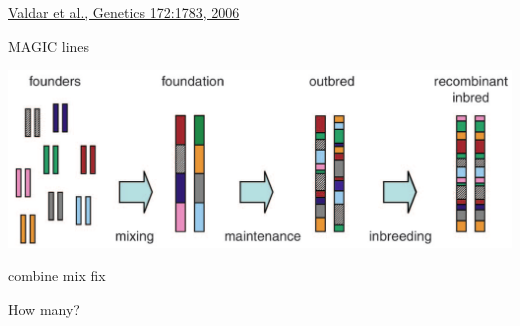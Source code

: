 \documentclass[12pt]{article}
\newcommand{\citesize}{\fontsize{14}{18} \selectfont}
\newcommand{\headsize}{\fontsize{35}{35} \selectfont}
\newcommand{\smallsize}{\fontsize{25}{30} \selectfont}
\newcommand{\smallersize}{\fontsize{20}{25} \selectfont}
\begin{document}
{\vfill

\hfill {\citesize \color{citecolor} \href{http://www.genetics.org/content/172/3/1783.full}{Valdar et al., Genetics 172:1783, 2006}}

\vspace*{5mm}


\newpage

\addtocounter{page}{-1}

\headsize \color{myyellow}
\hfill \begin{minipage}{5.75in}
\centering
MAGIC lines
\end{minipage}

\vspace{20mm}

\centerline{\includegraphics[width=10in]{Figs/valdar_genet2006.png}}

\smallsize \color{myyellow}
\hspace*{52mm} combine \hspace*{35mm} mix \hspace*{52mm} fix

\smallersize
\color{mywhite}
\vspace{20pt}

\hspace*{6mm}
\begin{minipage}[t]{45mm}
\vspace*{0mm}
\centering

How many? \\[20pt]

\end{minipage}
\hspace{57mm}
\begin{minipage}[t]{45mm}
\vspace*{0mm}
\centering


\end{minipage}
\hspace{18mm}
\begin{minipage}[t]{45mm}
\vspace*{0mm}
\centering


\end{minipage}


}
\end{document}
